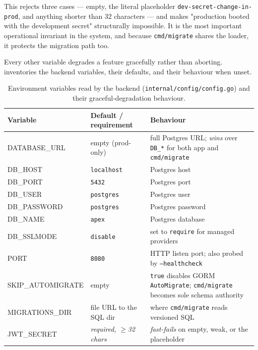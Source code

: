This rejects three cases --- empty, the literal placeholder \texttt{dev-secret-change-in-prod}, and anything shorter than 32 characters --- and makes "production booted with the development secret" structurally impossible. It is the most important operational invariant in the system, and because \texttt{cmd/migrate} shares the loader, it protects the migration path too.

Every other variable degrades a feature gracefully rather than aborting.  inventories the backend variables, their defaults, and their behaviour when unset.

\begin{table}[H]
  \centering
  \caption{Environment variables read by the backend (\texttt{internal/config/config.go}) and their graceful-degradation behaviour.}
  \label{tab:ch10-env}
  \small
  \begin{tabularx}{\linewidth}{>{\ttfamily}L{3.4cm} L{3.9cm} X}
    \toprule
    \normalfont Variable & Default / requirement & Behaviour \\
    \midrule
    DATABASE\_URL      & empty (prod-only)             & full Postgres URL; \emph{wins} over \texttt{DB\_*} for both app and \texttt{cmd/migrate} \\
    DB\_HOST           & \texttt{localhost}            & Postgres host \\
    DB\_PORT           & \texttt{5432}                 & Postgres port \\
    DB\_USER           & \texttt{postgres}             & Postgres user \\
    DB\_PASSWORD       & \texttt{postgres}             & Postgres password \\
    DB\_NAME           & \texttt{apex}                 & Postgres database \\
    DB\_SSLMODE        & \texttt{disable}              & set to \texttt{require} for managed providers \\
    PORT               & \texttt{8080}                 & HTTP listen port; also probed by \texttt{--healthcheck} \\
    SKIP\_AUTOMIGRATE  & empty                         & \texttt{true} disables GORM \texttt{AutoMigrate}; \texttt{cmd/migrate} becomes sole schema authority \\
    MIGRATIONS\_DIR    & file URL to the SQL dir       & where \texttt{cmd/migrate} reads versioned SQL \\
    JWT\_SECRET        & \normalfont\emph{required, $\geq$32 chars} & \normalfont\emph{fast-fails} on empty, weak, or the placeholder \\

\end{tabularx}
\end{table}
